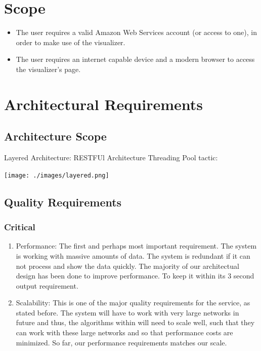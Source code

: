\documentclass[hidelinks,a4paper,12pt]{article}
\begin{document}
\section{Scope}
\begin {itemize}
	\item The user requires a valid Amazon Web Services account (or access to one), in order to make use of the visualizer.
	\item The user requires an internet capable device and a modern browser to access the visualizer's page.
\end{itemize}
\newpage

\section{Architectural Requirements}

\subsection{Architecture Scope}
Layered Architecture: 
RESTFUl Architecture
Threading Pool tactic:

\texttt{[image: ./images/layered.png]}\\[0.4cm] 

\subsection{Quality Requirements}
\subsubsection {Critical}
\begin{enumerate}  
	\item Performance: The first and perhaps most important requirement. The system is working with massive amounts of data. The system is redundant if it can not process and show the data quickly. The majority of our architectual design has been done to improve performance. To keep it within its 3 second output requirement. 
	\item Scalability: This is one of the major quality requirements for the service, as stated before. The system will have to work with very large networks in future and thus, the algorithms within will need to scale well, such that they can work with these large networks and so that performance costs are minimized. So far, our performance requirements matches our scale.
\end{enumerate}		
\end{document}
